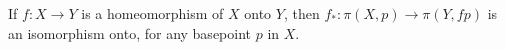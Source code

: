 If $f: X \to Y$ is a homeomorphism of $X$ onto $Y$, then $f_*: \pi(X,p) \to \pi(Y, fp)$ is an isomorphism onto, for any basepoint $p$ in $X$.
